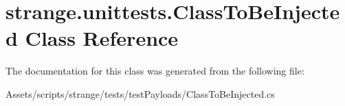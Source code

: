 \hypertarget{classstrange_1_1unittests_1_1_class_to_be_injected}{\section{strange.\-unittests.\-Class\-To\-Be\-Injected Class Reference}
\label{classstrange_1_1unittests_1_1_class_to_be_injected}
}


The documentation for this class was generated from the following file\-:\begin{DoxyCompactItemize}
\item 
Assets/scripts/strange/tests/test\-Payloads/Class\-To\-Be\-Injected.\-cs\end{DoxyCompactItemize}
